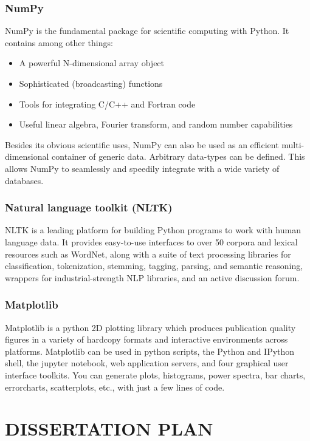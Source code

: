 \documentclass[oneside,a4paper,12pt]{pictreport}
\begin{document}
\subsection{NumPy}


NumPy is the fundamental package for scientific computing with Python. It contains among other things:
\begin{itemize}
\item A powerful N-dimensional array object
\item Sophisticated (broadcasting) functions
\item Tools for integrating C/C++ and Fortran code
\item Useful linear algebra, Fourier transform, and random number capabilities
\end{itemize}
Besides its obvious scientific uses, NumPy can also be used as
an efficient multi-dimensional container of generic data.
Arbitrary data-types can be defined. This allows NumPy to
seamlessly and speedily integrate with a wide variety of databases.

\subsection{Natural language toolkit (NLTK)}
NLTK is a leading platform for building Python programs to work with
human language data. It provides easy-to-use interfaces to over 50 corpora 
and lexical resources such as WordNet, along with a suite of text processing 
libraries for classification, tokenization, stemming, tagging, parsing, and 
semantic reasoning, wrappers for industrial-strength NLP libraries, and an active discussion forum.

\subsection{Matplotlib}
Matplotlib is a python 2D plotting library which produces publication 
quality figures in a variety of hardcopy formats and interactive environments 
across platforms. Matplotlib can be used in python scripts, the Python and IPython 
shell, the jupyter notebook, web application servers, and four graphical user interface 
toolkits. You can generate plots, histograms, power spectra, bar 
charts, errorcharts, scatterplots, etc., with just a few lines of code.

\chapter{DISSERTATION PLAN}
\end{document}
